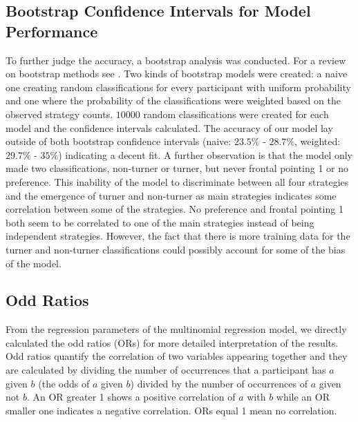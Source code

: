 \documentclass{frontiersSCNS} %
\begin{document}
 


\subsection{Bootstrap Confidence Intervals for Model Performance}
To further judge the accuracy, a bootstrap analysis was conducted. For a review on bootstrap methods see \citep{Efron1986}. Two kinds of bootstrap models were created: a naive one creating random classifications for every participant with uniform probability and one where the probability of the classifications were weighted based on the observed strategy counts. $10000$ random classifications were created for each model and the confidence intervals calculated. The accuracy of our model lay outside of both bootstrap confidence intervals (naive: $23.5\%$ - $28.7\%$, weighted: $29.7\%$ - $35\%$) indicating a decent fit.
A further observation is that the model only made two classifications, non-turner or turner, but never frontal pointing 1 or no preference. This inability of the model to discriminate between all four strategies and the emergence of turner and non-turner as main strategies indicates some correlation between some of the strategies. No preference and frontal pointing 1 both seem to be correlated to one of the main strategies instead of being independent strategies. However, the fact that there is more training data for the turner and non-turner classifications could possibly account for some of the bias of the model.

\subsection{Odd Ratios}
From the regression parameters of the multinomial regression model, we directly calculated the odd ratios (ORs) for more detailed interpretation of the results. Odd ratios quantify the correlation of two variables appearing together and they are calculated by dividing the number of occurrences that a participant has $a$ given $b$ (the odds of $a$ given $b$) divided by the number of occurrences of $a$ given not $b$. An OR greater 1 shows a positive correlation of $a$ with $b$ while an OR smaller one indicates a negative correlation. ORs equal 1 mean no correlation. 
\end{document}

